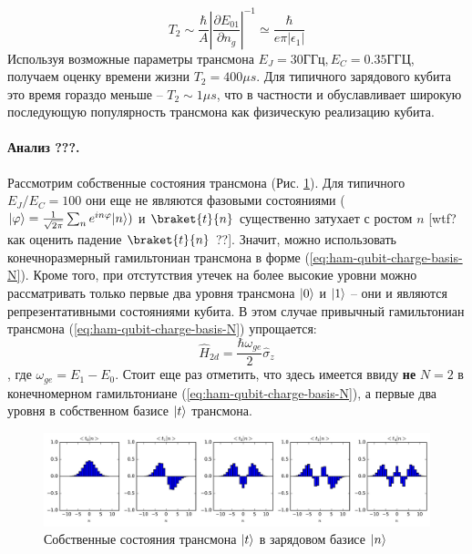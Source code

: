\documentclass[12pt, twoside]{report}
\DeclarePairedDelimiter\ket{\lvert}{\rangle}
\numberwithin{equation}{section}
\numberwithin{figure}{section}
\begin{document}
\begin{equation}
T_2 \sim \frac{\hbar}{A} \left|\frac{\partial E_{01}}{\partial n_g}\right|^{-1} \simeq \frac{\hbar}{e \pi \left| \epsilon_1 \right|}
\end{equation}
Используя возможные параметры трансмона $E_J = 30 ГГц, E_C = 0.35 ГГЦ$, получаем оценку времени жизни $T_2 = 400\mu s$. Для типичного зарядового кубита это время гораздо меньше -- $T_2 \sim 1\mu s$, что в частности и обуславливает широкую последующую популярность трансмона как физическую реализацию кубита. 
\newline
\paragraph{Анализ ???.} Рассмотрим собственные состояния трансмона (Рис. \ref{fig:transmon-eigenstates}). Для типичного $E_J / E_C = 100$ они еще не являются фазовыми состояниями ($\ket{\varphi} = \frac{1}{\sqrt{2 \pi}} \sum_n e^{i n \varphi} \ket{n}) $ и $\braket{t}{n}$ существенно затухает с ростом $n$ [wtf? как оценить падение $\braket{t}{n}$ ??]. Значит, можно использовать конечноразмерный гамильтониан трансмона в форме (\ref{eq:ham-qubit-charge-basis-N}). Кроме того, при отстутствия утечек на более высокие уровни можно рассматривать только первые два уровня трансмона $\ket{0}$ и $\ket{1}$ -- они и являются репрезентативными состояниями кубита. В этом случае привычный гамильтониан трансмона (\ref{eq:ham-qubit-charge-basis-N}) упрощается:
\begin{equation}
\hat{H}_{2d} = \frac{\hbar \omega_{ge}}{2} \hat{\sigma}_z
\label{eq:ham-qubit-2d}
\end{equation}
, где $\omega_{ge} = E_1 - E_0$. Стоит еще раз отметить, что здесь имеется ввиду \textbf{не} $N = 2$ в конечномерном гамильтониане (\ref{eq:ham-qubit-charge-basis-N}), а первые два уровня в собственном базисе $\ket{t}$ трансмона.
\begin{figure}[!h]
\centering
\includegraphics[width=1\textwidth]{Pictures2/transmon_eigenstates}
\caption{Собственные состояния трансмона $\ket{t}$ в зарядовом базисе $\ket{n}$}
\label{fig:transmon-eigenstates}
\end{figure}
\end{document}
